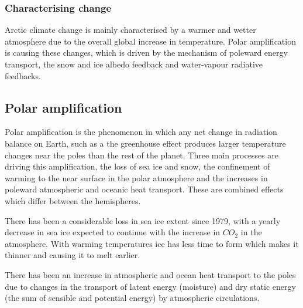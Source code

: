 \documentclass[12pt, oneside]{article}
\begin{document}
\subsubsection{Characterising change}
Arctic climate change is mainly characterised by a warmer and wetter atmosphere due to the overall global increase in temperature. Polar amplification is causing these changes, which is driven by the mechanism of poleward energy transport, the snow and ice albedo feedback and water-vapour radiative feedbacks. 

\subsection{Polar amplification}\label{polar_amplification}
{\color{blue}{How this effects 
- seasons
- sea ice changes }}

Polar amplification is the phenomenon in which any net change in radiation balance on Earth, such as a the greenhouse effect produces larger temperature changes near the poles than the rest of the planet. Three main processes are driving this amplification, the loss of sea ice and snow, the confinement of warming to the near surface in the polar atmosphere and the increases in poleward atmospheric and oceanic heat transport.   These are combined effects which differ between the hemispheres.

There has been a considerable loss in sea ice extent since 1979, with a yearly decrease in sea ice expected to continue with the increase in $CO_2$ in the atmosphere. With warming temperatures ice has less time to form which makes it thinner and causing it to melt earlier. 

There has been an increase in atmospheric and ocean heat transport to the poles due to changes in the transport of latent energy (moisture) and dry static energy (the sum of sensible and potential energy) by atmospheric circulations. 
\end{document}
